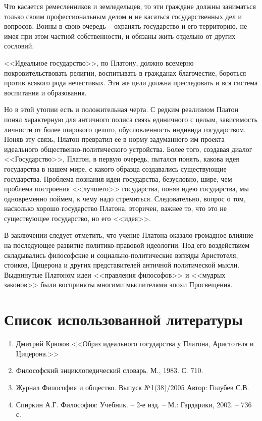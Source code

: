	Что касается ремесленников и земледельцев, то эти граждане должны 
	заниматься только своим профессиональным делом и не касаться 
	государственных дел и вопросов. Воины в свою очередь – охранять государство 
	и его территорию, не имея при этом частной собственности, и обязаны жить 
	отдельно от других сословий. 

	<<Идеальное государство>>, по Платону, должно всемерно покровительствовать 
	религии, воспитывать в гражданах благочестие, бороться против всякого рода 
	нечестивых. Эти же цели должна преследовать и вся система воспитания и 
	образования.

	Но в этой утопии есть и положительная черта. С редким реализмом Платон 
	понял характерную для античного полиса связь единичного с целым, 
	зависимость личности от более широкого целого, обусловленность индивида 
	государством. Поняв эту связь, Платон превратил ее в норму задуманного 
	им проекта идеального общественно-политического устройства. Более того, 
	создавая диалог <<Государство>>, Платон, в первую очередь, пытался понять, 
	какова идея государства в нашем мире, с какого образца создавались 
	существующие государства. Проблема познания идеи государства, безусловно, 
	шире, чем проблема построения <<лучшего>> государства, поняв идею 
	государства, мы одновременно поймем, к чему надо стремиться. 
	Следовательно, вопрос о том, насколько хорошо государство Платона, 
	вторичен, важнее то, что это не существующее государство, но его <<идея>>.

	В заключении следует отметить, что учение Платона оказало громадное 
	влияние на последующее развитие политико-правовой идеологии. Под его 
	воздействием складывались философские и социально-политические взгляды 
	Аристотеля, стоиков, Цицерона и других представителей античной политической 
	мысли. Выдвинутые Платоном идеи <<правления философов>> и <<мудрых законов>> 
	были восприняты многими мыслителями эпохи Просвещения.


\chapter{Список использованной литературы}
\begin{enumerate}
	\item Дмитрий Крюков <<Образ идеального государства у Платона, Аристотеля и Цицерона.>>
	\item Философский энциклопедический словарь. М., 1983. С. 710.
	\item Журнал Философия и общество. Выпуск №1(38)/2005 Автор: Голубев С.В.
	\item Спиркин А.Г. Философия: Учебник. – 2-е изд. – М.: Гардарики, 2002. – 736 с.
\end{enumerate}

